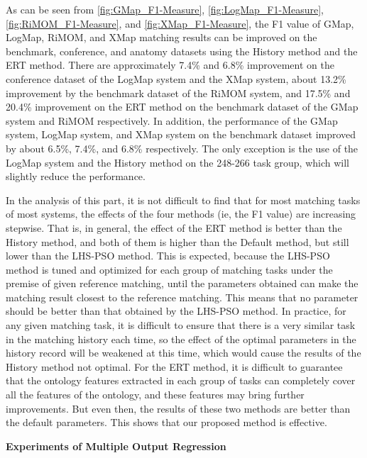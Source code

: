 \documentclass[twoside]{article}
\begin{document}
As can be seen from \ref{fig:GMap_F1-Measure}, \ref{fig:LogMap_F1-Measure}, \ref{fig:RiMOM_F1-Measure}, and \ref{fig:XMap_F1-Measure}, the F1 value of GMap, LogMap, RiMOM, and XMap matching results can be improved on the benchmark, conference, and anatomy datasets using the History method and the ERT method. There are  approximately 7.4\% and 6.8\% improvement on the conference dataset of the LogMap system and the XMap system, about 13.2\% improvement by the benchmark dataset of the RiMOM system, and 17.5\% and 20.4\% improvement on the ERT method on the benchmark dataset of the GMap system and RiMOM respectively. In addition, the performance of the GMap system, LogMap system, and XMap system on the benchmark dataset improved by about 6.5\%, 7.4\%, and 6.8\% respectively.
The only exception is the use of the LogMap system and the History method on the 248-266 task group, which will slightly reduce the performance.

In the analysis of this part, it is not difficult to find that for most matching tasks of most systems, the effects of the four methods (ie, the F1 value) are increasing stepwise.
That is, in general, the effect of the ERT method is better than the History method, and both of them is higher than the Default method, but still lower than the LHS-PSO method.
This is expected, because the LHS-PSO method is tuned and optimized for each group of matching tasks under the premise of given reference matching, until the parameters obtained can make the matching result closest to the reference matching.
This means that no parameter should be better than that obtained by the LHS-PSO method.
In practice, for any given matching task, it is difficult to ensure that there is a very similar task in the matching history each time, so the effect of the optimal parameters in the history record will be weakened at this time, which would cause the results of the History method not optimal.
For the ERT method, it is difficult to guarantee that the ontology features extracted in each group of tasks can completely cover all the features of the ontology, and these features may bring further improvements.
But even then, the results of these two methods are better than the default parameters.
This shows that our proposed method is effective.

{\bf Experiments of Multiple Output Regression}

%
\end{document}
